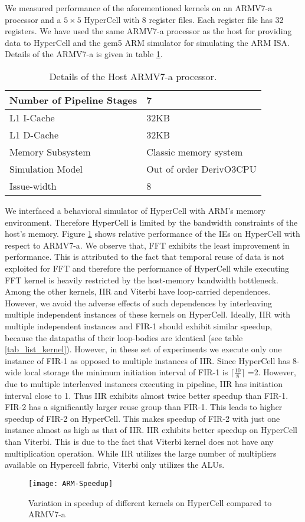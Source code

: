 We measured performance of the aforementioned kernels on an ARMV7-a processor and a $5\times5$ HyperCell with 8 register files. Each register file has 32 registers. 
We have used the same ARMV7-a processor as the host for providing data to HyperCell and the gem5 ARM simulator \cite{gem5} for simulating the ARM ISA. Details of the ARMV7-a is given in table \ref{tab_arm}.
\begin{table}[htp]
\caption{Details of the Host ARMV7-a processor.}
\label{tab_arm}
\centering
    \begin{tabular}{|p{4cm} | p{4cm} | }
    \hline
	Number of Pipeline Stages & 7\\ \hline
	L1 I-Cache & 32KB\\ \hline
	L1 D-Cache & 32KB\\ \hline
	Memory Subsystem  & Classic memory system \cite{gem5}\\ \hline 
	Simulation Model & Out of order DerivO3CPU \cite{gem5}\\ \hline
	Issue-width & 8\\ \hline
    \end{tabular}
\end{table}
We interfaced a behavioral simulator of HyperCell with ARM's memory environment. Therefore HyperCell is limited by the bandwidth constraints of the host's memory. Figure \ref{fig_arm_perf} shows relative performance of the IEs on HyperCell with respect to ARMV7-a. We observe that, FFT exhibits the least improvement in performance. This is attributed to the fact that temporal reuse of data is not exploited for FFT and therefore the performance of HyperCell while executing FFT kernel is heavily restricted by the host-memory bandwidth bottleneck. 
Among the other kernels, IIR and Viterbi have loop-carried dependences. However, we avoid the adverse effects of such dependences by interleaving multiple independent instances of these kernels on HyperCell. 
Ideally, IIR with multiple independent instances and FIR-1 should exhibit similar speedup, because the datapaths of their loop-bodies are identical (see table \ref{tab_list_kernel}). However, in these set of experiments we execute only one instance of FIR-1 as opposed to multiple instances of IIR. Since HyperCell has 8-wide local storage the minimum initiation interval of FIR-1 is $\lceil\frac{10}{8}\rceil$ =2. However, due to multiple interleaved instances executing in pipeline, IIR has initiation interval close to 1. Thus IIR exhibits almost twice better speedup than FIR-1. 
FIR-2 has a significantly larger reuse group than FIR-1. This leads to higher speedup of FIR-2 on HyperCell. This makes speedup of FIR-2 with just one instance almost as high as that of IIR.
IIR exhibits better speedup on HyperCell than Viterbi. This is due to the fact that Viterbi kernel does not have any multiplication operation. While IIR utilizes the large number of multipliers available on Hypercell fabric, Viterbi only utilizes the ALUs. 
\begin{figure}[!h]
  \centering
    \texttt{[image: ARM-Speedup]}
    \caption{Variation in speedup of different kernels on HyperCell compared to ARMV7-a}
\label{fig_arm_perf}
\end{figure}



